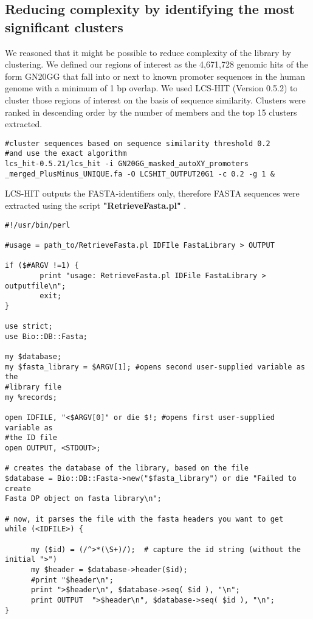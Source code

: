 \begin{footnotesize}
\subsection{Reducing complexity by identifying the most significant clusters}

We reasoned that it might be possible to reduce complexity of the library by clustering. We defined our regions of interest as the 4,671,728 genomic hits of the form GN20GG that fall into or next to known promoter sequences in the human genome with a minimum of 1 bp overlap. We used LCS-HIT (Version 0.5.2)\cite{Namiki:2013bv} to cluster those regions of interest on the basis of sequence similarity. Clusters were ranked in descending order by the number of members and the top 15 clusters extracted.

\begin{lstlisting}
#cluster sequences based on sequence similarity threshold 0.2 
#and use the exact algorithm 
lcs_hit-0.5.21/lcs_hit -i GN20GG_masked_autoXY_promoters
_merged_PlusMinus_UNIQUE.fa -O LCSHIT_OUTPUT20G1 -c 0.2 -g 1 & 
\end{lstlisting}

LCS-HIT outputs the FASTA-identifiers only, therefore FASTA sequences were extracted using the script \textbf{"RetrieveFasta.pl"} \cite{Retrieve:Online}.

\begin{lstlisting}
#!/usr/bin/perl

#usage = path_to/RetrieveFasta.pl IDFIle FastaLibrary > OUTPUT

if ($#ARGV !=1) {
        print "usage: RetrieveFasta.pl IDFile FastaLibrary > outputfile\n";
        exit;
}

use strict;
use Bio::DB::Fasta;

my $database;
my $fasta_library = $ARGV[1]; #opens second user-supplied variable as the 
#library file
my %records;

open IDFILE, "<$ARGV[0]" or die $!; #opens first user-supplied variable as 
#the ID file
open OUTPUT, <STDOUT>;

# creates the database of the library, based on the file
$database = Bio::DB::Fasta->new("$fasta_library") or die "Failed to create 
Fasta DP object on fasta library\n";

# now, it parses the file with the fasta headers you want to get
while (<IDFILE>) {

      my ($id) = (/^>*(\S+)/);  # capture the id string (without the initial ">")
      my $header = $database->header($id);
      #print "$header\n";
      print ">$header\n", $database->seq( $id ), "\n";
      print OUTPUT  ">$header\n", $database->seq( $id ), "\n";
}


\end{lstlisting}
\end{footnotesize}
